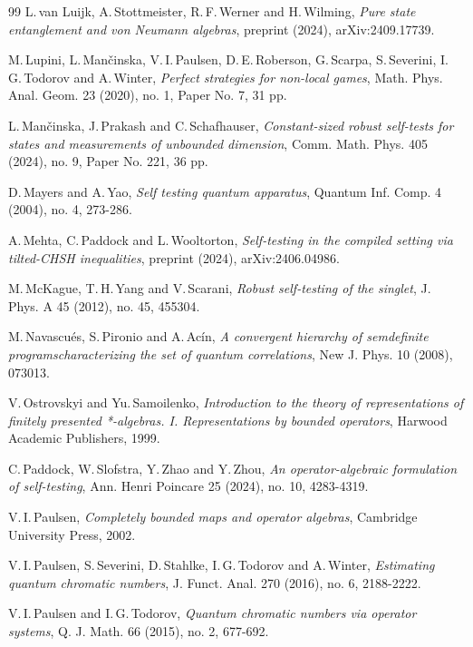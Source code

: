 \documentclass[11pt]{amsart}
\theoremstyle{definition}
\begin{document}
\begin{thebibliography}{99}
{\sc L.\,van Luijk, A.\,Stottmeister, R.\,F.\,Werner and  H.\,Wilming},
{\it Pure state entanglement and von Neumann algebras},
{\rm preprint (2024), arXiv:2409.17739}.


{\sc M.\,Lupini, L.\,Man\v{c}inska, V.\,I.\,Paulsen, D.\,E.\,Roberson, G.\,Scarpa, S.\,Severini, I.\,G.\,Todorov and A.\,Winter},
{\it Perfect strategies for non-local games},
{\rm Math. Phys. Anal. Geom. 23 (2020), no. 1, Paper No. 7, 31 pp.}



{\sc L.\,Man\v{c}inska, J.\,Prakash and C.\,Schafhauser},
{\it Constant-sized robust self-tests for states and measurements of unbounded dimension},
{\rm Comm. Math. Phys.   
405 (2024), no. 9, Paper No. 221, 36 pp.}

{\sc D.\,Mayers and A.\,Yao},
{\it Self testing quantum apparatus},
{\rm Quantum Inf. Comp. 4 (2004), no. 4, 273-286}.


{\sc A.\,Mehta, C.\,Paddock and L.\,Wooltorton},
{\it Self-testing in the compiled setting via tilted-CHSH inequalities},
{\rm preprint (2024), arXiv:2406.04986}.


{\sc M.\,McKague, T.\,H.\,Yang and V.\,Scarani}, 
{\it Robust self-testing of the singlet}, 
{\rm J. Phys. A 45 (2012), no. 45, 455304}.


{\sc M.\,Navascu\'es, S.\,Pironio and A.\,Ac\'in}, 
{\it A convergent hierarchy of semdeﬁnite programscharacterizing the set of quantum correlations}, 
{\rm New J. Phys. 10 (2008), 073013}.

{\sc V.\,Ostrovskyi and Yu.\,Samoilenko},
{\it Introduction to the theory of representations of finitely presented *-algebras. I. Representations by bounded operators},
{\rm Harwood Academic Publishers, 1999}.

{\sc C.\,Paddock, W.\,Slofstra, Y.\,Zhao and Y.\,Zhou},
{\it An operator-algebraic formulation of self-testing},
{\rm Ann. Henri Poincare 25 (2024), no. 10, 4283-4319}.

{\sc V.\,I.\,Paulsen},
{\it Completely bounded maps and operator algebras},
{\rm Cambridge University Press, 2002}.


{\sc V.\,I.\,Paulsen, S.\,Severini, D.\,Stahlke, I.\,G.\,Todorov and A.\,Winter}, 
{\it Estimating quantum chromatic numbers}, 
{\rm J. Funct. Anal. 270 (2016), no. 6, 2188-2222}.


{\sc V.\,I.\,Paulsen and I.\,G.\,Todorov}, 
{\it Quantum chromatic numbers via operator systems},
{\rm Q. J. Math. 66 (2015), no. 2, 677-692}.



\end{thebibliography}
\end{document}
